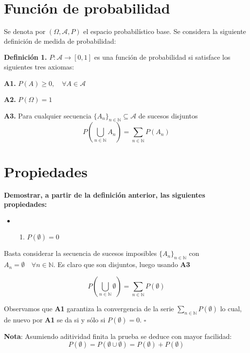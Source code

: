 \hypertarget{funciuxf3n-de-probabilidad}{%
\section{Función de probabilidad}\label{funciuxf3n-de-probabilidad}}

Se denota por \((\Omega, \mathcal{A},P)\) el espacio probabilístico
base. Se considera la siguiente definición de medida de probabilidad:

\textbf{Definición 1.} \(P : \mathcal{A} \rightarrow[0,1]\) es una
función de probabilidad si satisface los siguientes tres axiomas:

\textbf{A1.} \(P(A) \geq 0, \quad \forall A \in \mathcal{A}\)

\textbf{A2.} \(P(\Omega) = 1\)

\textbf{A3.} Para cualquier secuencia
\(\{A_n\}_{n \in \mathbb{N}} \subseteq \mathcal{A}\) de sucesos
disjuntos \[
P\left(\bigcup_{n\in \mathbb{N}}A_n\right) = \sum_{n \in \mathbb{N}} P(A_n)
\]

\hypertarget{propiedades}{%
\section{Propiedades}\label{propiedades}}

\textbf{Demostrar, a partir de la definición anterior, las siguientes
propiedades:}

\begin{itemize}
\item
  \begin{enumerate}
  \def\labelenumi{\alph{enumi})}
  \tightlist
  \item
    \(P(\emptyset) = 0\)
  \end{enumerate}
\end{itemize}

Basta considerar la secuencia de sucesos imposibles
\(\{ A_n \}_{n \in \mathbb{N}}\) con
\(A_n = \emptyset \quad \forall n \in \mathbb{N}\). Es claro que son
disjuntos, luego usando \textbf{A3}

\[
P\left(\bigcup_{n \in \mathbb{N}} \emptyset \right) = \sum_{n \in \mathbb{N}} P(\emptyset)
\]

Observamos que \textbf{A1} garantiza la convergencia de la serie
\(\sum_{n \in \mathbb{N}} P(\emptyset)\) lo cual, de nuevo por
\textbf{A1} se da si y sólo si \(P(\emptyset) = 0\). \(\square\)

\textbf{Nota}: Asumiendo aditividad finita la prueba se deduce con mayor
facilidad: \[
P(\emptyset) = P(\emptyset \cup \emptyset) = P(\emptyset)+ P(\emptyset) 
\]

